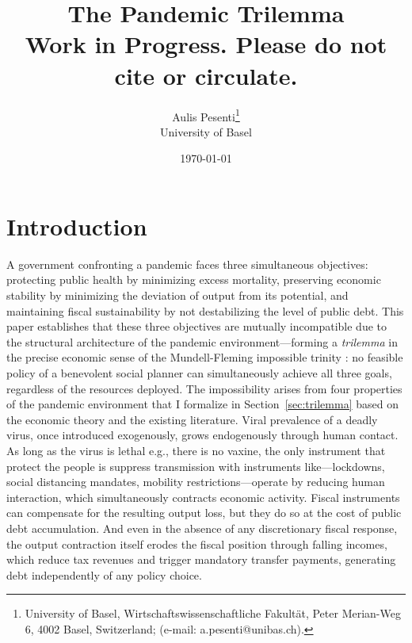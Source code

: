 \documentclass[12pt, a4paper]{article}
\title{\textbf{The Pandemic Trilemma} \\[1em] 
\large Work in Progress. Please do not cite or circulate.}
\author{Aulis Pesenti\setcounter{footnote}{1}\thanks{University of Basel, Wirtschaftswissenschaftliche Fakultät, Peter Merian-Weg 6, 4002 Basel, Switzerland; (e-mail: a.pesenti@unibas.ch).} \\ University of Basel}
\date{\today}
\begin{document}
\maketitle

\begin{abstract}

\end{abstract}




\newpage

\section{Introduction}

A government confronting a pandemic faces three simultaneous objectives: protecting public health by minimizing excess mortality, preserving economic stability by minimizing the deviation of output from its potential, and maintaining fiscal sustainability by not destabilizing the level of public debt. This paper establishes that these three objectives are mutually incompatible due to the structural architecture of the pandemic environment---forming a \textit{trilemma} in the precise economic sense of the Mundell-Fleming impossible trinity \citet{mundell1963}: no feasible policy of a benevolent social planner can simultaneously achieve all three goals, regardless of the resources deployed.
The impossibility arises from four properties of the pandemic environment that I formalize in Section~\ref{sec:trilemma} based on the economic theory and the existing literature. Viral prevalence of a deadly virus, once introduced exogenously, grows endogenously through human contact. As long as the virus is lethal e.g., there is no vaxine, the only instrument that protect the people is suppress transmission with instruments like---lockdowns, social distancing mandates, mobility restrictions---operate by reducing human interaction, which simultaneously contracts economic activity. Fiscal instruments can compensate for the resulting output loss, but they do so at the cost of public debt accumulation. And even in the absence of any discretionary fiscal response, the output contraction itself erodes the fiscal position through falling incomes, which reduce tax revenues and trigger mandatory transfer payments, generating debt independently of any policy choice.
\end{document}
